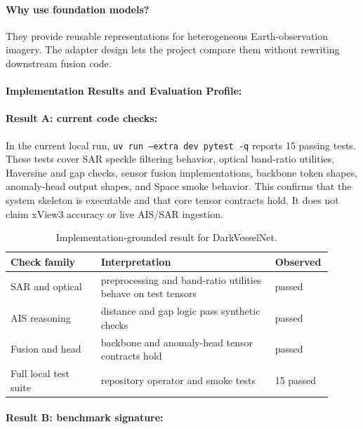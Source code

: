 \documentclass{article}
\begin{document}
\paragraph{Why use foundation models?}
They provide reusable representations for heterogeneous Earth-observation imagery. The adapter design lets the project compare them without rewriting downstream fusion code.

\paragraph{Implementation Results and Evaluation Profile:}

\paragraph{Result A: current code checks:}

In the current local run, \texttt{uv run --extra dev pytest -q} reports 15 passing tests. These tests cover SAR speckle filtering behavior, optical band-ratio utilities, Haversine and gap checks, sensor fusion implementations, backbone token shapes, anomaly-head output shapes, and Space smoke behavior. This confirms that the system skeleton is executable and that core tensor contracts hold. It does not claim xView3 accuracy or live AIS/SAR ingestion.

\begin{table}[t]
\centering
\caption{Implementation-grounded result for DarkVesselNet.}
\begin{tabular}{@{}p{0.27\linewidth}p{0.52\linewidth}p{0.12\linewidth}@{}}
\toprule
\textbf{Check family} & \textbf{Interpretation} & \textbf{Observed}\\
\midrule
SAR and optical & preprocessing and band-ratio utilities behave on test tensors & passed\\
AIS reasoning & distance and gap logic pass synthetic checks & passed\\
Fusion and head & backbone and anomaly-head tensor contracts hold & passed\\
Full local test suite & repository operator and smoke tests & 15 passed\\
\bottomrule
\end{tabular}
\end{table}

\paragraph{Result B: benchmark signature:}
\end{document}

